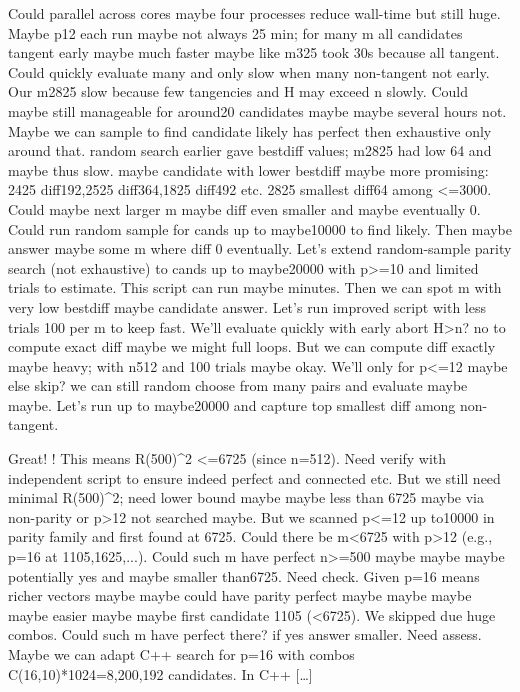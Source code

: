 \begin{decodedreasoningpanel}
Could parallel across cores maybe four processes reduce wall-time but still huge.
Maybe p12 each run maybe not always 25 min; for many m all candidates tangent early maybe much faster maybe like m325 took 30s because all tangent. Could quickly evaluate many and only slow when many non-tangent not early.
Our m2825 slow because few tangencies and H may exceed n slowly.
Could maybe still manageable for around20 candidates maybe maybe several hours not.
Maybe we can sample to find candidate likely has perfect then exhaustive only around that. random search earlier gave bestdiff values; m2825 had low 64 and maybe thus slow. maybe candidate with lower bestdiff maybe more promising: 2425 diff192,2525 diff364,1825 diff492 etc. 2825 smallest diff64 among <=3000.
Could maybe next larger m maybe diff even smaller and maybe eventually 0. Could run random sample for cands up to maybe10000 to find likely.
Then maybe answer maybe some m where diff 0 eventually.
Let's extend random-sample parity search (not exhaustive) to cands up to maybe20000 with p>=10 and limited trials to estimate. This script can run maybe minutes.
Then we can spot m with very low bestdiff maybe candidate answer.
Let's run improved script with less trials 100 per m to keep fast. We'll evaluate quickly with early abort H>n? no to compute exact diff maybe we might full loops. But we can compute diff exactly maybe heavy; with n512 and 100 trials maybe okay.
We'll only for p<=12 maybe else skip? we can still random choose from many pairs and evaluate maybe maybe.
Let's run up to maybe20000 and capture top smallest diff among non-tangent.
\end{decodedreasoningpanel}

\begin{decodedanswerpanel}
\end{decodedanswerpanel}

\begin{decodedreasoningpanel}
Great! ! This means R(500)\textasciicircum{}2 <=6725 (since n=512).
Need verify with independent script to ensure indeed perfect and connected etc.
But we still need minimal R(500)\textasciicircum{}2; need lower bound maybe maybe less than 6725 maybe via non-parity or p>12 not searched maybe. But we scanned p<=12 up to10000 in parity family and first found at 6725. Could there be m<6725 with p>12 (e.g., p=16 at 1105,1625,...).  Could such m have perfect n>=500 maybe maybe maybe potentially yes and maybe smaller than6725. Need check.
Given p=16 means richer vectors maybe maybe could have parity perfect maybe maybe maybe maybe easier maybe maybe first candidate 1105 (<6725). We skipped due huge combos. Could such m have perfect there? if yes answer smaller.
Need assess.
Maybe we can adapt C++ search for p=16 with combos C(16,10)*1024=8,200,192 candidates. In C++ {[\ldots]}
\end{decodedreasoningpanel}

